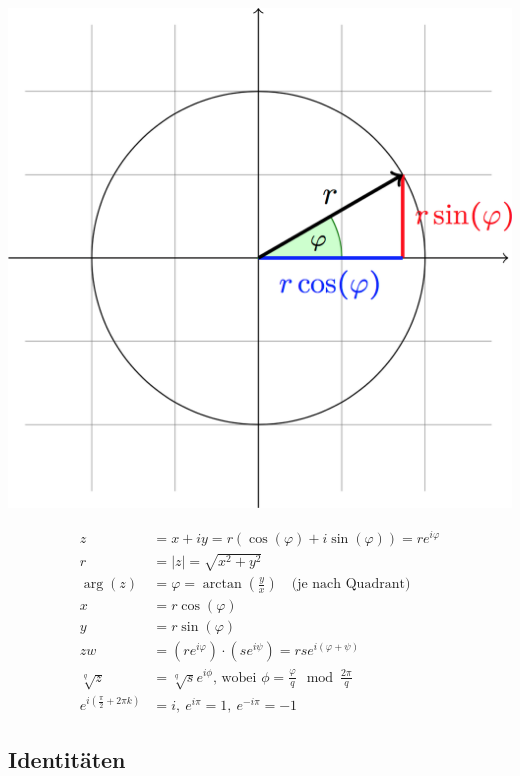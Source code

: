 \documentclass[11pt]{article}
\begin{document}
\begin{minipage}[c]{0.5\textwidth}
\centering
\includegraphics[width=\linewidth,keepaspectratio=true]{images/polarform}
\end{minipage}
%
\begin{minipage}[c]{0.5\textwidth}
\begin{equation*}
\begin{split}
	z & = x + iy = r(\cos(\varphi) + i\sin(\varphi)) = re^{i\varphi} \\
	r & = |z| = \sqrt{x^2 + y^2} \\
	\arg(z) & = \varphi  = \arctan(\frac{y}{x}) \quad \text{(je nach Quadrant)}  \\
	x & = r\cos(\varphi) \\
	y & = r\sin(\varphi) \\
	zw & = (re^{i\varphi})\cdot(se^{i\psi}) = rse^{i(\varphi + \psi)} \\
	\sqrt[q]{z} & = \sqrt[q]{s}e^{i\phi}\text{, wobei }\phi = \frac{\varphi}{q} \mod \frac{2\pi}{q} \\
	e^{i(\frac{\pi}{2} + 2\pi k)} & = i,\ e^{i\pi} = 1, \ e^{-i\pi} = -1
\end{split}
\end{equation*}
\end{minipage}

\subsection{Identit{\"a}ten}
\end{document}
